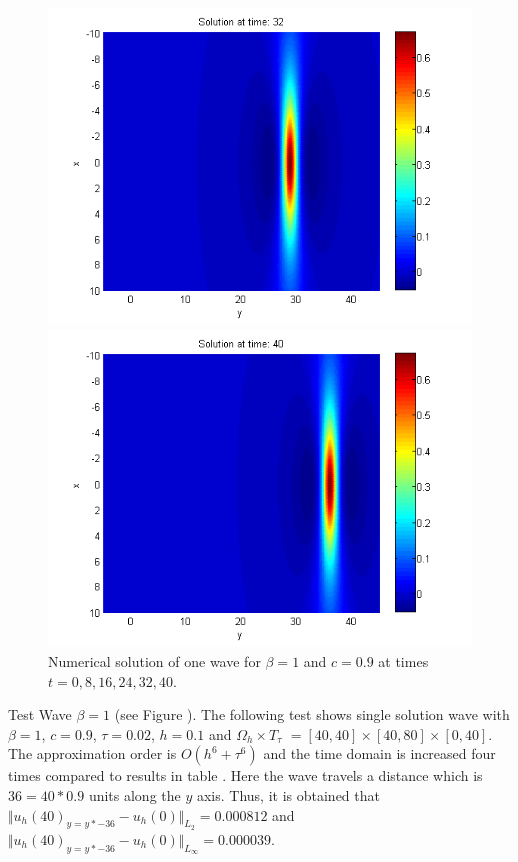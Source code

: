 \documentclass[11pt,a4paper,twoside]{article}
\begin{document}
\begin{figure}[!htbp]
\begin{minipage}[b]{0.31\linewidth}
		 \includegraphics[width=\linewidth]{Pictures/Solution1_t=32.png}
	\end{minipage}
	\begin{minipage}[b]{0.31\linewidth}
		 \includegraphics[width=\linewidth]{Pictures/Solution1_t=40.png}
	\end{minipage}
	\caption{Numerical solution of one wave for $\beta=1$ and $c = 0.9$ at times $t=0,8,16,24,32,40$.}
	\label{fig:oneWaveA}
\end{figure}

Test Wave $\beta = 1$ (see Figure ). The following test shows single solution wave with $\beta = 1$, $c = 0.9$, $\tau = 0.02$, $h = 0.1$ and $\Omega_h \times T_{\tau}$ $= [40, 40] \times [40, 80] \times [0, 40]$. The approximation order is $O(h^6 + \tau^6)$ and the time domain is increased four times compared to results in table . Here the wave travels a distance which is $36 = 40*0.9$ units along the $y$ axis. Thus, it is obtained that $\Vert u_h(40)_{y = y*-36} - u_h(0) \Vert_{L_2} = 0.000812$ and $\Vert u_h(40)_{y = y*-36} - u_h(0) \Vert_{L_\infty} = 0.000039$.
\end{document}
